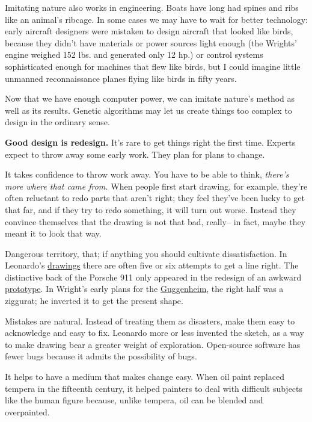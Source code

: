 Imitating nature also works in engineering.  Boats have
long had spines and ribs like an animal's ribcage.
In some cases we may have to wait for better technology:
early aircraft designers were mistaken to
design aircraft that looked like birds, because they didn't
have materials or power sources light enough (the Wrights' engine
weighed 152 lbs. and
generated only 12 hp.) or control systems sophisticated
enough for machines that flew like birds, but I could
imagine little unmanned reconnaissance planes flying
like birds in fifty years.

Now that we have enough computer power, we can imitate nature's   
method as well as its results.  Genetic algorithms may let us
create things too complex to design in the ordinary
sense.



\textbf{Good design is redesign.}  It's rare to get things right
the first time.  Experts expect to throw away some early work.
They plan for plans to change.

It takes confidence to throw work away.  You have to be able 
to think, \emph{there's more where that came from.}   
When people first start drawing, for example,
they're often reluctant to redo parts that aren't
right; they feel they've been lucky to get that far,   
and if they try to redo something, it will turn out worse.  Instead
they convince themselves that the drawing is not that bad,
really-- in fact, maybe they meant it to look that way.

Dangerous territory, that; if anything you should
cultivate dissatisfaction.
In Leonardo's \href{http://www.paulgraham.com/leonardo.html}{drawings} there are often five
or six attempts to get a line right.
The distinctive back of the Porsche
911 only appeared in the redesign of an awkward 
\href{http://www.paulgraham.com/porsche695.html}{prototype}.
In Wright's early plans for the 
\href{http://www.paulgraham.com/guggen.html}{Guggenheim},
the right half was a ziggurat; he inverted it to get the
present shape.

Mistakes are natural.  Instead of treating them
as disasters, make them easy to acknowledge and easy to fix.
Leonardo more or less invented the sketch, as a
way to make drawing bear a greater weight of exploration.
Open-source software has fewer bugs because it admits the
possibility of bugs.

It helps to have a medium that makes change easy.
When oil paint replaced tempera in the fifteenth century,
it helped
painters to deal with difficult subjects like the human 
figure because, unlike tempera, oil can be blended and overpainted.




